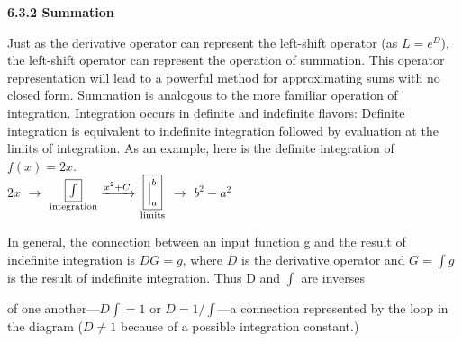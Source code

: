 \documentclass[a4paper]{article}
\begin{document}
\noindent \Large{{\bf 6.3.2 Summation}} \vspace{0.5cm}


\noindent 
{Just as the derivative operator can represent the left-shift operator (as $L =
e^D$), the left-shift operator can represent the operation of summation. This
operator representation will lead to a powerful method for approximating
sums with no closed form.
Summation is analogous to the more familiar operation of integration.
Integration occurs in definite and indefinite flavors: Definite integration
is equivalent to indefinite integration followed by evaluation at the limits
of integration. As an example, here is the definite integration of $f(x) = 2x$.}
\\


\hangindent=1.5cm {$2x$ $\longrightarrow$ $\underset{\textrm{integration}}{\fbox{\huge{$\int$}}}\xrightarrow{x^2+C}$ $\underset{\textrm{limits}}{\fbox{$\Big|_a^b$}}$} $\longrightarrow$ $b^2-a^2$ \vspace{0.5cm}


\noindent In general, the connection between an input function g and the result of
indefinite integration is $DG = g$, where $D$ is the derivative operator and
$G=\int g$ is the result of indefinite integration. Thus D and $\int$ are inverses\\



\newpage


\pagestyle{fancy}

\renewcommand{\headrulewidth}{0pt}
\fancyhf{}

\noindent \Large {of one another---$D\int=1$ or $D=1/\int$---a connection represented by the loop in the diagram ($D\not=1$ because of a possible integration constant.)}
\\
\\
\\
\end{document}
